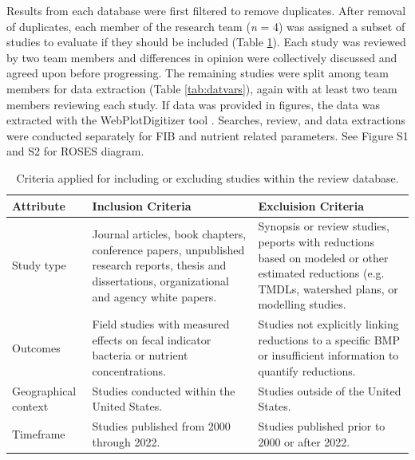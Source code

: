 \documentclass[utf8]{FrontiersinHarvard}
\begin{document}
Results from each database were first filtered to remove duplicates.
After removal of duplicates, each member of the research team (\emph{n} = 4) was assigned a subset of studies to evaluate if they should be included (Table \ref{tab:criteria}).
Each study was reviewed by two team members and differences in opinion were collectively discussed and agreed upon before progressing.
The remaining studies were split among team members for data extraction (Table \ref{tab:datvars}), again with at least two team members reviewing each study.
If data was provided in figures, the data was extracted with the WebPlotDigitizer tool \citep{rohatgiWebPlotDigitizer2022}.
Searches, review, and data extractions were conducted separately for FIB and nutrient related parameters.
See Figure S1 and S2 for ROSES diagram.

\begin{table}

\caption{\label{tab:criteria}Criteria applied for including or excluding studies within the review database.}
\centering
\begin{tabular}[t]{>{\raggedright\arraybackslash}p{5em}>{\raggedright\arraybackslash}p{15em}>{\raggedright\arraybackslash}p{15em}}
\toprule
Attribute & Inclusion Criteria & Excluision Criteria\\
\midrule
Study type & Journal articles, book chapters, conference papers, unpublished research reports, thesis and dissertations, organizational and agency white papers. & Synopsis or review studies, peports with reductions based on modeled or other estimated reductions (e.g. TMDLs, watershed plans, or modelling studies.\\
Outcomes & Field studies with measured effects on fecal indicator bacteria or nutrient concentrations. & Studies not explicitly linking reductions to a specific BMP or insufficient information to quantify reductions.\\
Geographical context & Studies conducted within the United States. & Studies outside of the United States.\\
Timeframe & Studies published from 2000 through 2022. & Studies published prior to 2000 or after 2022.\\
\bottomrule
\end{tabular}
\end{table}
\end{document}
